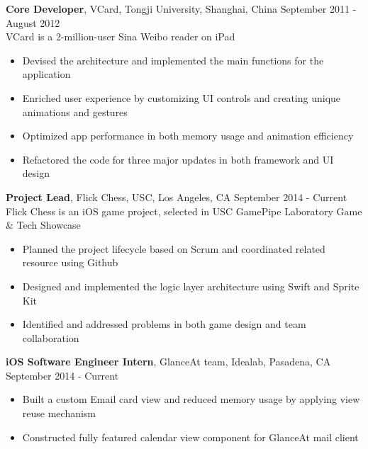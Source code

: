 \documentclass[line, overlapped]{res}
\begin{document}
\begin{resume}
\begin{itemize}
 \end{itemize}

\textbf{Core Developer}, VCard, Tongji University, Shanghai, China \hfill September 2011 - August 2012\\
 VCard is a 2-million-user Sina Weibo reader on iPad
 \begin{itemize} \itemsep -2pt  %

  \item Devised the architecture and implemented the main functions for the application

  \item Enriched user experience by customizing UI controls and creating unique animations and gestures

  \item Optimized app performance in both memory usage and animation efficiency

  \item Refactored the code for three major updates in both framework and UI design

 \end{itemize}
 
\textbf{Project Lead}, Flick Chess, USC, Los Angeles, CA \hfill September 2014 - Current\\
Flick Chess is an iOS game project, selected in USC GamePipe Laboratory Game \& Tech Showcase
\begin{itemize} \itemsep -2pt %
  \item Planned the project lifecycle based on Scrum and coordinated related resource using Github
  
  \item Designed and implemented the logic layer architecture using Swift and Sprite Kit
  
  \item Identified and addressed problems in both game design and team collaboration

\end{itemize}
 
 \textbf{iOS Software Engineer Intern}, GlanceAt team, Idealab, Pasadena, CA \hfill September 2014 - Current
 \begin{itemize} \itemsep -2pt
 
 \item Built a custom Email card view and reduced memory usage by applying view reuse mechanism
 
 \item Constructed fully featured calendar view component for GlanceAt mail client
 

\end{itemize}
\end{resume}
\end{document}
